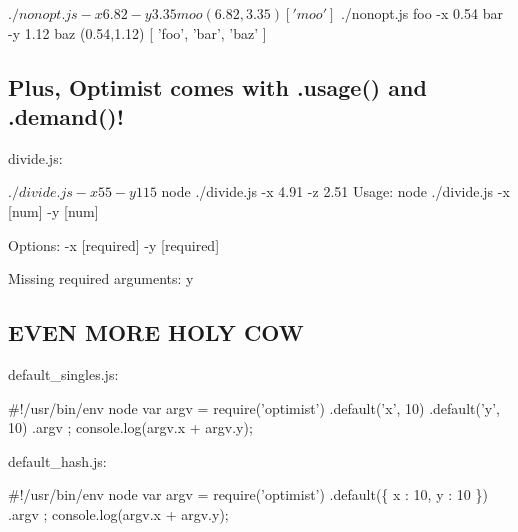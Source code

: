  \begin{DoxyVerb}$ ./nonopt.js -x 6.82 -y 3.35 moo
(6.82,3.35)
[ 'moo' ]

$ ./nonopt.js foo -x 0.54 bar -y 1.12 baz
(0.54,1.12)
[ 'foo', 'bar', 'baz' ]
\end{DoxyVerb}


\subsection*{Plus, Optimist comes with .usage() and .demand()! }

divide.\+js\+:






 \begin{DoxyVerb}$ ./divide.js -x 55 -y 11
5

$ node ./divide.js -x 4.91 -z 2.51
Usage: node ./divide.js -x [num] -y [num]

Options:
  -x  [required]
  -y  [required]

Missing required arguments: y
\end{DoxyVerb}


\subsection*{E\+V\+EN M\+O\+RE H\+O\+LY C\+OW }

default\+\_\+singles.\+js\+:


\begin{DoxyCode}
#!/usr/bin/env node
var argv = require('optimist')
    .default('x', 10)
    .default('y', 10)
    .argv
;
console.log(argv.x + argv.y);
\end{DoxyCode}






default\+\_\+hash.\+js\+:


\begin{DoxyCode}
#!/usr/bin/env node
var argv = require('optimist')
    .default(\{ x : 10, y : 10 \})
    .argv
;
console.log(argv.x + argv.y);
\end{DoxyCode}




